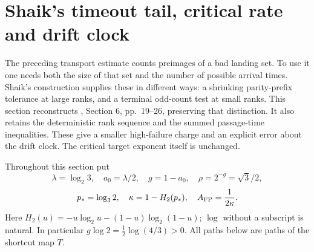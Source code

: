 \documentclass[11pt]{article}
\theoremstyle{remark}\newtheorem{remark}[proposition]{Remark}
\begin{document}
\section{Shaik's timeout tail, critical rate and drift clock}
\label{sec:shaik-timeout}
The preceding transport estimate counts preimages of a bad landing set.
To use it one needs both the size of that set and the number of possible
arrival times. Shaik's construction supplies these in different ways:
a shrinking parity-prefix tolerance at large ranks, and a terminal
odd-count test at small ranks. This section reconstructs
\cite{Shaik2026v324}, Section 6, pp.~19--26, preserving that distinction.
It also retains the deterministic rank sequence and the summed
passage-time inequalities. These give a smaller high-failure charge and
an explicit error about the drift clock. The critical target exponent
itself is unchanged.

Throughout this section put
\[
 \lambda=\log_2 3,\quad a_0=\lambda/2,\quad
 g=1-a_0,\quad \rho=2^{-g}=\sqrt3/2,
\]
\[
 p_*=\log_3 2,\quad \kappa=1-H_2(p_*),\quad
 A_{\rm FP}=\frac1{2\kappa}.
\]
Here \(H_2(u)=-u\log_2u-(1-u)\log_2(1-u)\);
\(\log\) without a subscript is natural. In particular
\(g\log2=\frac12\log(4/3)>0\).
All paths below are paths of the shortcut map \(T\).
\end{document}
